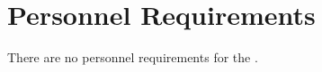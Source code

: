 \KNEADSECTIONNEWPAGE
\section{Personnel Requirements}
\label{lab:sec_Personnel}
% 

There are no personnel requirements for the \ThisSystem.

